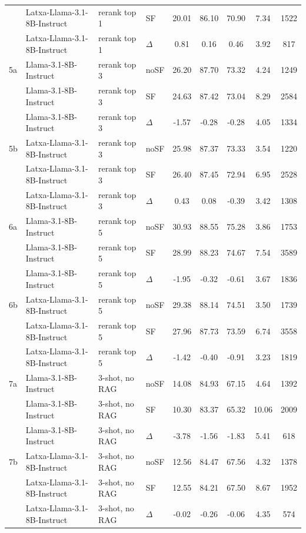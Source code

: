 \begin{scriptsize}
\begin{longtable}{l l l l c c c c c}
 & Latxa-Llama-3.1-8B-Instruct & rerank top 1 & SF & 20.01 & 86.10 & 70.90 & 7.34 & 1522 \\
 & Latxa-Llama-3.1-8B-Instruct & rerank top 1 & $\Delta$ & 0.81 & 0.16 & 0.46 & 3.92 & 817 \\
\dmidrule
5a & Llama-3.1-8B-Instruct & rerank top 3 & noSF & 26.20 & 87.70 & 73.32 & 4.24 & 1249 \\
 & Llama-3.1-8B-Instruct & rerank top 3 & SF & 24.63 & 87.42 & 73.04 & 8.29 & 2584 \\
 & Llama-3.1-8B-Instruct & rerank top 3 & $\Delta$ & -1.57 & -0.28 & -0.28 & 4.05 & 1334 \\
5b & Latxa-Llama-3.1-8B-Instruct & rerank top 3 & noSF & 25.98 & 87.37 & 73.33 & 3.54 & 1220 \\
 & Latxa-Llama-3.1-8B-Instruct & rerank top 3 & SF & 26.40 & 87.45 & 72.94 & 6.95 & 2528 \\
 & Latxa-Llama-3.1-8B-Instruct & rerank top 3 & $\Delta$ & 0.43 & 0.08 & -0.39 & 3.42 & 1308 \\
\dmidrule
\rowcolor{tabhighlight}6a & Llama-3.1-8B-Instruct & rerank top 5 & noSF & 30.93 & 88.55 & 75.28 & 3.86 & 1753 \\
 & Llama-3.1-8B-Instruct & rerank top 5 & SF & 28.99 & 88.23 & 74.67 & 7.54 & 3589 \\
 & Llama-3.1-8B-Instruct & rerank top 5 & $\Delta$ & -1.95 & -0.32 & -0.61 & 3.67 & 1836 \\
6b & Latxa-Llama-3.1-8B-Instruct & rerank top 5 & noSF & 29.38 & 88.14 & 74.51 & 3.50 & 1739 \\
 & Latxa-Llama-3.1-8B-Instruct & rerank top 5 & SF & 27.96 & 87.73 & 73.59 & 6.74 & 3558 \\
 & Latxa-Llama-3.1-8B-Instruct & rerank top 5 & $\Delta$ & -1.42 & -0.40 & -0.91 & 3.23 & 1819 \\
\dmidrule
7a & Llama-3.1-8B-Instruct & 3-shot, no RAG & noSF & 14.08 & 84.93 & 67.15 & 4.64 & 1392 \\
 & Llama-3.1-8B-Instruct & 3-shot, no RAG & SF & 10.30 & 83.37 & 65.32 & 10.06 & 2009 \\
 & Llama-3.1-8B-Instruct & 3-shot, no RAG & $\Delta$ & -3.78 & -1.56 & -1.83 & 5.41 & 618 \\
7b & Latxa-Llama-3.1-8B-Instruct & 3-shot, no RAG & noSF & 12.56 & 84.47 & 67.56 & 4.32 & 1378 \\
 & Latxa-Llama-3.1-8B-Instruct & 3-shot, no RAG & SF & 12.55 & 84.21 & 67.50 & 8.67 & 1952 \\
 & Latxa-Llama-3.1-8B-Instruct & 3-shot, no RAG & $\Delta$ & -0.02 & -0.26 & -0.06 & 4.35 & 574 \\

\end{longtable}
\end{scriptsize}
